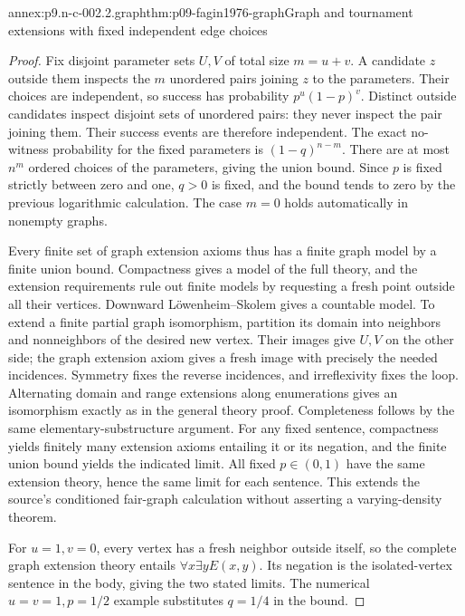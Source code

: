 \begin{annexitem}{annex:p9.n-c-002.2.graph}{thm:p09-fagin1976-graph}{Graph and tournament extensions with fixed independent edge choices}
\begin{proof}
Fix disjoint parameter sets \(U,V\) of total size \(m=u+v\).
A candidate \(z\) outside them inspects the \(m\) unordered
pairs joining \(z\) to the parameters.  Their choices are independent,
so success has probability \(p^u(1-p)^v\).  Distinct outside
candidates inspect disjoint sets of unordered pairs: they never inspect
the pair joining them.  Their success events are therefore independent.
The exact no-witness probability for the fixed parameters is
\((1-q)^{n-m}\).  There are at most \(n^m\) ordered choices
of the parameters, giving the union bound.  Since \(p\) is fixed
strictly between zero and one, \(q>0\) is fixed, and the bound
tends to zero by the previous logarithmic calculation.  The case
\(m=0\) holds automatically in nonempty graphs.

Every finite set of graph extension axioms thus has a finite graph model
by a finite union bound.  Compactness gives a model of the full theory,
and the extension requirements rule out finite models by requesting a
fresh point outside all their vertices.  Downward L\"owenheim--Skolem
gives a countable model.  To extend a finite partial graph isomorphism,
partition its domain into neighbors and nonneighbors of the desired new
vertex.  Their images give \(U,V\) on the other side; the graph
extension axiom gives a fresh image with precisely the needed incidences.
Symmetry fixes the reverse incidences, and irreflexivity fixes the loop.
Alternating domain and range extensions along enumerations gives an
isomorphism exactly as in the general theory proof.  Completeness follows
by the same elementary-substructure argument.  For any fixed sentence,
compactness yields finitely many extension axioms entailing it or its
negation, and the finite union bound yields the indicated limit.
All fixed \(p\in(0,1)\) have the same extension theory, hence the
same limit for each sentence.  This extends the source's conditioned
fair-graph calculation without asserting a varying-density theorem.

For \(u=1,v=0\), every vertex has a fresh neighbor outside itself,
so the complete graph extension theory entails
\(\forall x\exists y E(x,y)\).  Its negation is the isolated-vertex
sentence in the body, giving the two stated limits.  The numerical
\(u=v=1,p=1/2\) example substitutes \(q=1/4\) in the bound.


\end{proof}
\end{annexitem}
